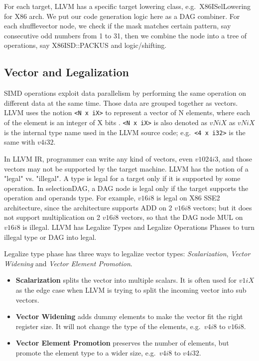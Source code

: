 For each target, LLVM has a specific target lowering class, e.g.\ X86ISelLowering for X86 arch. We put our code generation logic here as a DAG combiner. For each shufflevector node, we check if the mask matches certain pattern, say consecutive odd numbers from 1 to 31, then we combine the node into a tree of operations, say X86ISD::PACKUS and logic/shifting.

\subsection{Vector and Legalization}
SIMD operations exploit data parallelism by performing the same operation on different data at the same time. Those data are grouped together as vectors. LLVM uses the notion \verb|<N x iX>| to represent a vector of N elements, where each of the element is an integer of X bits \cite{llvm_lang_ref, hybrid_simd_type_legalize}. \verb|<N x iX>| is also denoted as $vNiX$ as $vNiX$ is the internal type name used in the LLVM source code; e.g.\ \verb|<4 x i32>| is the same with $v4i32$.

In LLVM IR, programmer can write any kind of vectors, even $v1024i3$, and those vectors may not be supported by the target machine. LLVM has the notion of a "legal" vs. "illegal". A type is legal for a target only if it is supported by some operation. In selectionDAG, a DAG node is legal only if the target supports the operation and operands type. For example, $v16i8$ is legal on X86 SSE2 architecture, since the architecture supports ADD on 2 $v16i8$ vectors; but it does not support multiplication on 2 $v16i8$ vectors, so that the DAG node MUL on $v16i8$ is illegal. LLVM has Legalize Types and Legalize Operations Phases to turn illegal type or DAG into legal\cite{llvm_code_gen}.

Legalize type phase has three ways to legalize vector types\cite{hybrid_simd_type_legalize}: \textit{Scalarization}, \textit{Vector Widening} and \textit{Vector Element Promotion}.

\begin{itemize}
    \item \textbf{Scalarization} splits the vector into multiple scalars. It is often used for $v1iX$ as the edge case when LLVM is trying to split the incoming vector into sub vectors.
    \item \textbf{Vector Widening} adds dummy elements to make the vector fit the right register size. It will not change the type of the elements, e.g.\ $v4i8$ to $v16i8$.
    \item \textbf{Vector Element Promotion} preserves the number of elements, but promote the element type to a wider size, e.g.\ $v4i8$ to $v4i32$.
\end{itemize}

